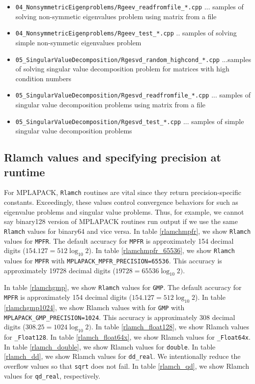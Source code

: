 \documentclass[12pt]{article}
\begin{document}
\begin{itemize}
\item {\tt 04\_NonsymmetricEigenproblems/Rgeev\_readfromfile\_*.cpp} ... samples of solving non-symmetic eigenvalues problem using matrix from a file
\item {\tt 04\_NonsymmetricEigenproblems/Rgeev\_test\_*.cpp} .. samples of solving simple non-symmetic eigenvalues problem
\item {\tt 05\_SingularValueDecomposition/Rgesvd\_random\_highcond\_*.cpp} ...samples of solving singular value decomposition problem for matrices with high condition numbers
\item {\tt 05\_SingularValueDecomposition/Rgesvd\_readfromfile\_*.cpp} ... samples of singular value decomposition problems using matrix from a file
\item {\tt 05\_SingularValueDecomposition/Rgesvd\_test\_*.cpp} ... samples of simple singular value decomposition problems
\end{itemize}

\subsection{Rlamch values and specifying precision at runtime}
For MPLAPACK, {\tt Rlamch} routines are vital since they return precision-specific constants. Exceedingly, these values control convergence behaviors for such as eigenvalue problems and singular value problems. Thus, for example, we cannot say binary128 version of MPLAPACK routines run output if we use the same {\tt Rlamch} values for binary64 and vice versa.
In table \ref{rlamchmpfr}, we show {\tt Rlamch} values for {\tt MPFR}. The default accuracy for {\tt MPFR} is approximately 154 decimal digits ($154.127 =512 \log_{10}2$).
In table \ref{rlamchmpfr_65536}, we show {\tt Rlamch} values for {\tt MPFR} with {\tt MPLAPACK\_MPFR\_PRECISION=65536}. This accuracy is approximately 19728 decimal digits ($19728 = 65536 \log_{10}2)$.

In table \ref{rlamchgmp}, we show {\tt Rlamch} values for {\tt GMP}. The default accuracy for {\tt MPFR} is approximately 154 decimal digits ($154.127 =512 \log_{10}2$).
In table \ref{rlamchgmp1024}, we show Rlamch values with for {\tt GMP} with {\tt MPLAPACK\_GMP\_PRECISION=1024}. This accuracy is approximately 308 decimal digits ($308.25 = 1024 \log_{10}2)$.
In table \ref{rlamch_float128}, we show Rlamch values for {\tt \_Float128}.
In table \ref{rlamch_float64x}, we show Rlamch values for {\tt \_Float64x}.
In table \ref{rlamch_double}, we show Rlamch values for {\tt double}.
In table \ref{rlamch_dd}, we show Rlamch values for {\tt dd\_real}. We intentionally reduce the overflow values
so that {\tt sqrt} does not fail.
In table \ref{rlamch_qd}, we show Rlamch values for {\tt qd\_real}, respectively.
\end{document}

